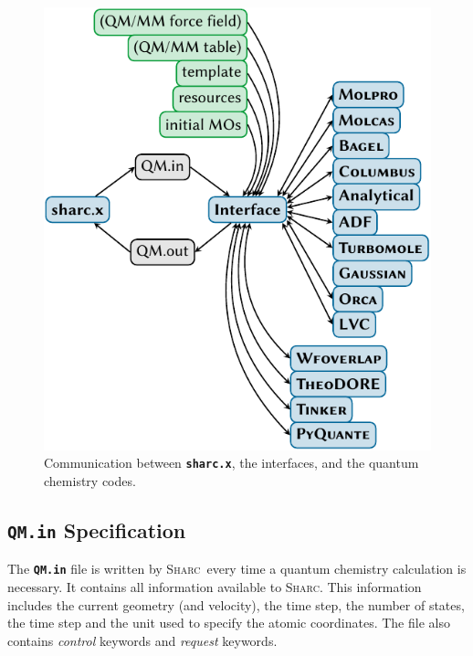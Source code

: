 \documentclass[a4paper,10pt,DIV=15,openany,twoside=false]{scrbook}
\newcommand{\sharc}{\textsc{Sharc}}
\newcommand{\ttt}[1]{\textbf{\texttt{#1}}}
\begin{document}
\begin{figure}[htb]
  \centering
  \includegraphics[scale=1]{img/interfaces/general.pdf}
  \caption{Communication between \ttt{sharc.x}, the interfaces, and the quantum chemistry codes.}
  \label{fig:interface_general}
\end{figure}

\subsection{\ttt{QM.in} Specification}\label{intf:qmin}

The \ttt{QM.in} file is written by \sharc\ every time a quantum chemistry calculation is necessary. It contains all information available to \sharc. This information includes the current geometry (and velocity), the time step, the number of states, the time step and the unit used to specify the atomic coordinates. The file also contains \textit{control} keywords and \textit{request} keywords. 
\end{document}
